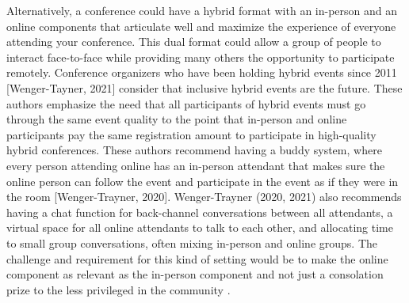 \documentclass[10pt,letterpaper]{article}
\begin{document}
Alternatively, a conference could have a hybrid format with an in-person and an online components that articulate well and maximize the experience of everyone attending your conference. This dual format could allow a group of people to interact face-to-face while providing many others the opportunity to participate remotely. 
Conference organizers who have been holding hybrid events since 2011 [Wenger-Tayner, 2021] consider that inclusive hybrid events are the future. These authors emphasize the need that all participants of hybrid events must go through the same event quality to the point that in-person and online participants pay the same registration amount to participate in high-quality hybrid conferences. These authors recommend having a buddy system, where every person attending online has an in-person attendant that makes sure the online person can follow the event and participate in the event as if they were in the room [Wenger-Trayner, 2020]. Wenger-Trayner (2020, 2021) also recommends having a chat function for back-channel conversations between all attendants, a virtual space for all online attendants to talk to each other, and allocating time to small group conversations, often mixing in-person and online groups. 
The challenge and requirement for this kind of setting would be to make the online component as relevant as the in-person component and not just a consolation prize to the less privileged in the community \cite{jooKeepOnlineOption2021,ninerBetterWhomLeveling2021}.
\end{document}
